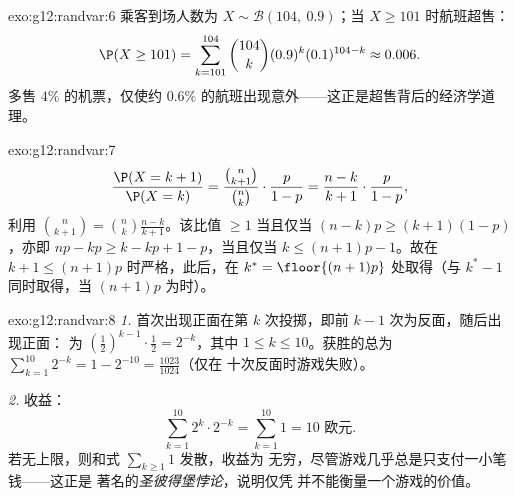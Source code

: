\begin{solution}{exo:g12:randvar:6}
乘客到场人数为 $X \sim \mathcal B(104,\ 0.9)$；当
$X \geq 101$ 时航班超售：
\[
\P(X \geq 101) = \sum_{k=101}^{104}\binom{104}{k}(0.9)^k(0.1)^{104-k}
\approx 0.006 .
\]
多售 $4\%$ 的机票，仅使约
$0.6\%$ 的航班出现意外——这正是超售背后的经济学道理。
\end{solution}

\begin{solution}{exo:g12:randvar:7}
\[
\frac{\P(X = k+1)}{\P(X = k)}
= \frac{\binom{n}{k+1}}{\binom nk}\cdot\frac{p}{1-p}
= \frac{n - k}{k + 1}\cdot\frac{p}{1-p},
\]
利用 $\binom{n}{k+1} = \binom nk \frac{n-k}{k+1}$。该比值 $\geq 1$
当且仅当 $(n-k)p \geq (k+1)(1-p)$，亦即 $np - k p \geq k - kp + 1 - p$，当且仅当
$k \leq (n+1)p - 1$。故在
$k + 1 \leq (n+1)p$ 时严格，此后，在
$k^* = \floor{(n+1)p}$ 处取得（与 $k^* - 1$ 同时取得，当
$(n+1)p$ 为时）。
\end{solution}

\begin{solution}{exo:g12:randvar:8}
\emph{1.} 首次出现正面在第 $k$ 次投掷，即前 $k-1$ 次为反面，随后出现正面：
为 $\left(\frac12\right)^{k-1}\cdot\frac12 = 2^{-k}$，其中
$1 \leq k \leq 10$。获胜的总为
$\sum_{k=1}^{10} 2^{-k} = 1 - 2^{-10} = \frac{1023}{1024}$（仅在
十次反面时游戏失败）。

\emph{2.} 收益：
\[
\sum_{k=1}^{10} 2^k \cdot 2^{-k} = \sum_{k=1}^{10} 1 = 10 \text{ 欧元}.
\]
若无上限，则和式 $\sum_{k\geq1} 1$ 发散，收益为
无穷，尽管游戏几乎总是只支付一小笔钱——这正是
著名的\emph{圣彼得堡悖论}，说明仅凭
并不能衡量一个游戏的价值。
\end{solution}

